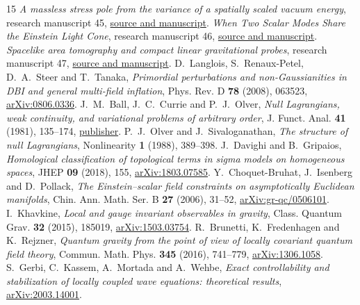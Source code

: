 \documentclass[11pt]{article}
\begin{document}
\begin{thebibliography}{15}\setlength{\itemsep}{2pt}
 \emph{A massless stress pole from the variance of a spatially scaled vacuum energy}, research manuscript 45, \href{https://github.com/g3173028019-beep/ai-automated-quantum-gravity-research/tree/main/papers/45-vacuum-stress-massless-pole}{source and manuscript}.
 \emph{When Two Scalar Modes Share the Einstein Light Cone}, research manuscript 46, \href{https://github.com/g3173028019-beep/ai-automated-quantum-gravity-research/tree/main/papers/46-einstein-scalar-common-cone}{source and manuscript}.
 \emph{Spacelike area tomography and compact linear gravitational probes}, research manuscript 47, \href{https://github.com/g3173028019-beep/ai-automated-quantum-gravity-research/tree/main/papers/47-spacelike-area-tomography}{source and manuscript}.
 D.~Langlois, S.~Renaux-Petel, D.~A.~Steer and T.~Tanaka, \emph{Primordial perturbations and non-Gaussianities in DBI and general multi-field inflation}, Phys. Rev. D \textbf{78} (2008), 063523, \href{https://arxiv.org/abs/0806.0336}{arXiv:0806.0336}.
 J.~M.~Ball, J.~C.~Currie and P.~J.~Olver, \emph{Null Lagrangians, weak continuity, and variational problems of arbitrary order}, J. Funct. Anal. \textbf{41} (1981), 135--174, \href{https://doi.org/10.1016/0022-1236(81)90085-9}{publisher}.
 P.~J.~Olver and J.~Sivaloganathan, \emph{The structure of null Lagrangians}, Nonlinearity \textbf{1} (1988), 389--398.
 J.~Davighi and B.~Gripaios, \emph{Homological classification of topological terms in sigma models on homogeneous spaces}, JHEP \textbf{09} (2018), 155, \href{https://arxiv.org/abs/1803.07585}{arXiv:1803.07585}.
 Y.~Choquet-Bruhat, J.~Isenberg and D.~Pollack, \emph{The Einstein--scalar field constraints on asymptotically Euclidean manifolds}, Chin. Ann. Math. Ser. B \textbf{27} (2006), 31--52, \href{https://arxiv.org/abs/gr-qc/0506101}{arXiv:gr-qc/0506101}.
 I.~Khavkine, \emph{Local and gauge invariant observables in gravity}, Class. Quantum Grav. \textbf{32} (2015), 185019, \href{https://arxiv.org/abs/1503.03754}{arXiv:1503.03754}.
 R.~Brunetti, K.~Fredenhagen and K.~Rejzner, \emph{Quantum gravity from the point of view of locally covariant quantum field theory}, Commun. Math. Phys. \textbf{345} (2016), 741--779, \href{https://arxiv.org/abs/1306.1058}{arXiv:1306.1058}.
 S.~Gerbi, C.~Kassem, A.~Mortada and A.~Wehbe, \emph{Exact controllability and stabilization of locally coupled wave equations: theoretical results}, \href{https://arxiv.org/abs/2003.14001}{arXiv:2003.14001}.
\end{thebibliography}
\end{document}
